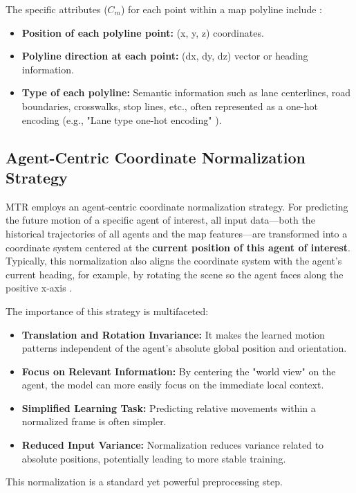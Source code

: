\begin{itemize}
    The specific attributes ($C_m$) for each point within a map polyline include \cite{Shi2022MTR, Shi2022MTR_A}:
    \begin{itemize}
        \item \textbf{Position of each polyline point:} (x, y, z) coordinates.
        \item \textbf{Polyline direction at each point:} (dx, dy, dz) vector or heading information.
        \item \textbf{Type of each polyline:} Semantic information such as lane centerlines, road boundaries, crosswalks, stop lines, etc., often represented as a one-hot encoding (e.g., "Lane type one-hot encoding" \cite{Shi2022MTR_A}).
    \end{itemize}
\end{itemize}

\subsection{Agent-Centric Coordinate Normalization Strategy}
\label{subsec:agent_centric_norm}

MTR employs an agent-centric coordinate normalization strategy. For predicting the future motion of a specific agent of interest, all input data—both the historical trajectories of all agents and the map features—are transformed into a coordinate system centered at the \textbf{current position of this agent of interest}. Typically, this normalization also aligns the coordinate system with the agent's current heading, for example, by rotating the scene so the agent faces along the positive x-axis \cite{Shi2022MTR, Shi2022MTR_A, DenseTNT2021}.

The importance of this strategy is multifaceted:
\begin{itemize}
    \item \textbf{Translation and Rotation Invariance:} It makes the learned motion patterns independent of the agent's absolute global position and orientation.
    \item \textbf{Focus on Relevant Information:} By centering the "world view" on the agent, the model can more easily focus on the immediate local context.
    \item \textbf{Simplified Learning Task:} Predicting relative movements within a normalized frame is often simpler.
    \item \textbf{Reduced Input Variance:} Normalization reduces variance related to absolute positions, potentially leading to more stable training.
\end{itemize}
This normalization is a standard yet powerful preprocessing step.

